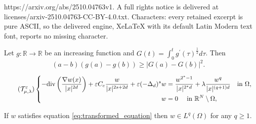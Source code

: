 \documentclass[10pt,a4paper]{amsart}
\newcommand{\la} {\lambda}
\newcommand{\om} {\Omega}
\newcommand{\real}{\mathbb{R}}
\newcommand{\rnn}{\mathbb{R}^{N}}
\begin{document}
https://arxiv.org/abs/2510.04763v1. A full rights notice is delivered at licenses/arxiv-2510.04763-CC-BY-4.0.txt. Characters: every retained excerpt is pure ASCII, so the delivered engine, XeLaTeX with its default Latin Modern text font, reports no missing character.
\begin{lemma}\label{ineq:A2}
Let $g : \real \to \real $ be an increasing function and $G(t) = \int_0^t g^{\prime} (\tau)^{\frac{1}{2}} d\tau$. Then
\begin{equation*}
    (a - b)(g(a) - g(b)) \geq |G(a) - G(b)|^2.
\end{equation*}
\end{lemma}

\begin{equation}\label{eq:transformed_equation}\tag{$\mathcal{T_{\mu,\la}^{\varepsilon}}$}
\left\{
\begin{aligned}
    -\mathrm{div}\left( \frac{\nabla w(x)}{|x|^{2 d}}\right) + \varepsilon C_c \frac{w}{|x|^{2s + 2d}} + \varepsilon (-\Delta_{d})^s w &= \frac{w^{2^* - 1}}{|x|^{2^* d}} + \lambda  \frac{w^q}{|x|^{(q+1) d}} \quad \text{in } \Omega,\\
    w &= 0 \quad \text{ in } \rnn \setminus \om,
\end{aligned}
\right.
\end{equation}

\begin{lemma}\label{lem:moser_iter_lem2}
If $w$ satisfies equation \eqref{eq:transformed_equation} then $w \in L^q(\om)$ for any $q \geq 1$.    
\end{lemma}
\end{document}

